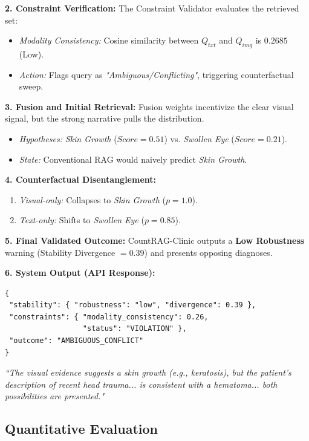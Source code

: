 \documentclass[conference]{IEEEtran}
\begin{document}
\textbf{2. Constraint Verification:}
The Constraint Validator evaluates the retrieved set:
\begin{itemize}
    \item \textit{Modality Consistency:} Cosine similarity between $Q_{txt}$ and $Q_{img}$ is $\mathbf{0.2685}$ (Low).
    \item \textit{Action:} Flags query as \textit{"Ambiguous/Conflicting"}, triggering counterfactual sweep.
\end{itemize}

\textbf{3. Fusion and Initial Retrieval:}
Fusion weights incentivize the clear visual signal, but the strong narrative pulls the distribution.
\begin{itemize}
    \item \textit{Hypotheses:} \textit{Skin Growth} ($Score=0.51$) vs. \textit{Swollen Eye} ($Score=0.21$).
    \item \textit{State:} Conventional RAG would naively predict \textit{Skin Growth}.
\end{itemize}

\textbf{4. Counterfactual Disentanglement:}
\begin{enumerate}
    \item \textit{Visual-only:} Collapses to \textit{Skin Growth} ($p=1.0$).
    \item \textit{Text-only:} Shifts to \textit{Swollen Eye} ($p=0.85$).
\end{enumerate}

\textbf{5. Final Validated Outcome:}
CountRAG-Clinic outputs a \textbf{Low Robustness} warning (Stability Divergence $= 0.39$) and presents opposing diagnoses.

\textbf{6. System Output (API Response):}
\begin{verbatim}
{
 "stability": { "robustness": "low", "divergence": 0.39 },
 "constraints": { "modality_consistency": 0.26, 
                  "status": "VIOLATION" },
 "outcome": "AMBIGUOUS_CONFLICT"
}
\end{verbatim}

\textit{``The visual evidence suggests a skin growth (e.g., keratosis), but the patient's description of recent head trauma... is consistent with a hematoma... both possibilities are presented."}

\subsection{Quantitative Evaluation}
\end{document}
